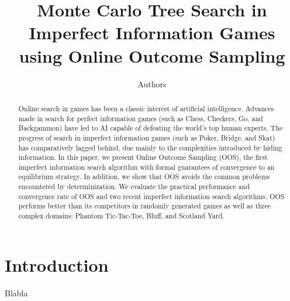 \documentclass[letterpaper]{article}
\begin{document}
%
\title{Monte Carlo Tree Search in Imperfect Information Games\\using Online Outcome Sampling}
\author{Authors}


\maketitle

\begin{abstract}
Online search in games has been a classic interest of artificial intelligence.
Advances made in search for perfect information games (such as Chess, Checkers, Go, and Backgammon) have led to AI capable of defeating the world's top human experts. 
The progress of search in imperfect information games (such as Poker, Bridge, and Skat) has comparatively lagged behind, due mainly to the complexities introduced by hiding information. 
In this paper, we present Online Outcome Sampling (OOS), the first imperfect information search algorithm with formal guarantees of convergence to an equilibrium strategy.   
In addition, we show that OOS avoids the common problems encountered by determinization.
We evaluate the practical performance and convergence rate of OOS and two recent imperfect information search algorithms. OOS performs better than its competitors in randomly generated games as well as three complex domains: Phantom Tic-Tac-Toe, Bluff, and Scotland Yard.  
\end{abstract}

\section{Introduction}

Blabla

\end{document}
